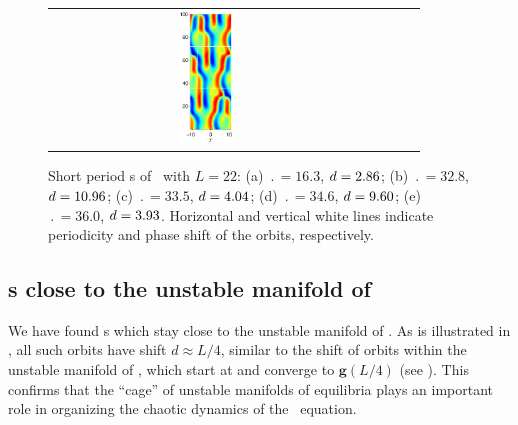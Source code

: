\begin{figure}[t]
\begin{center}
\begin{tabular}{ccccc}
\includegraphics[width=0.18\textwidth]{figs/ks22rpo036.0-03.93.eps}
\end{tabular}
\end{center}
\caption{Short period \rpo s of \KSe\ with $L = 22$: 
(a) $\period{} = 16.3$, $d = 2.86$; 
(b) $\period{} = 32.8$, $d = 10.96$; 
(c) $\period{} = 33.5$, $d = 4.04$; 
(d) $\period{} = 34.6$, $d = 9.60$; 
(e) $\period{} = 36.0$, $d = 3.93$. 
Horizontal and vertical white lines indicate periodicity and phase 
shift of the orbits, respectively.
}\label{f:ks22rposShort}
\end{figure}

\subsection{\Rpo s close to the unstable manifold of  }

We have found  \rpo s which stay 
 close to the unstable 
manifold of .  
As is illustrated in , all such orbits have
shift $d \approx L/4$, similar to the shift of orbits within the
unstable manifold of , which start at  and converge
to $\mathbf{g}(L/4)$ (see ).
This confirms that the ``cage'' of unstable manifolds of equilibria 
plays an important role in organizing the chaotic dynamics of 
the \KS\ equation.

